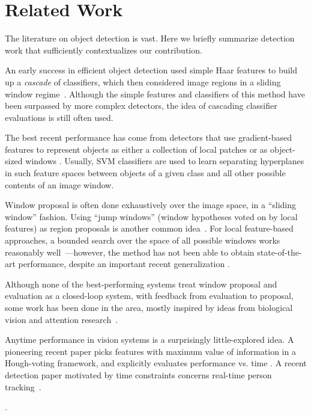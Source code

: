 \section{Related Work}
The literature on object detection is vast.
Here we briefly summarize detection work that sufficiently contextualizes our contribution.

An early success in efficient object detection used simple Haar features to build up a \emph{cascade} of classifiers, which then considered image regions in a sliding window regime~\cite{Viola2001}.
Although the simple features and classifiers of this method have been surpassed by more complex detectors, the idea of cascading classifier evaluations is still often used.

The best recent performance has come from detectors that use gradient-based features to represent objects as either a collection of local patches or as object-sized windows \cite{Dalal2005,Lowe2004}.
Usually, SVM classifiers are used to learn separating hyperplanes in such feature spaces between objects of a given class and all other possible contents of an image window.

Window proposal is often done exhaustively over the image space, in a ``sliding window'' fashion.
Using ``jump windows'' (window hypotheses voted on by local features) as region proposals is another common idea~\cite{Chum2007b,Vedaldi2009,Vijayanarasimhan2011}.
For local feature-based approaches, a bounded search over the space of all possible windows works reasonably well~\cite{Lampert2008b}---however, the method has not been able to obtain state-of-the-art performance, despite an important recent generalization \cite{Lehmann2011a}.

Although none of the best-performing systems treat window proposal and evaluation as a closed-loop system, with feedback from evaluation to proposal, some work has been done in the area, mostly inspired by ideas from biological vision and attention research~\cite{Butko2009,Vogel2008,Paletta2005}.

Anytime performance in vision systems is a surprisingly little-explored idea.
A pioneering recent paper picks features with maximum value of information in a Hough-voting framework, and explicitly evaluates performance vs. time \cite{Vijayanarasimhan2010}.
A recent detection paper motivated by time constraints concerns real-time person tracking~\cite{Mitzel2011b}.

 \cite{Gao2011}.


